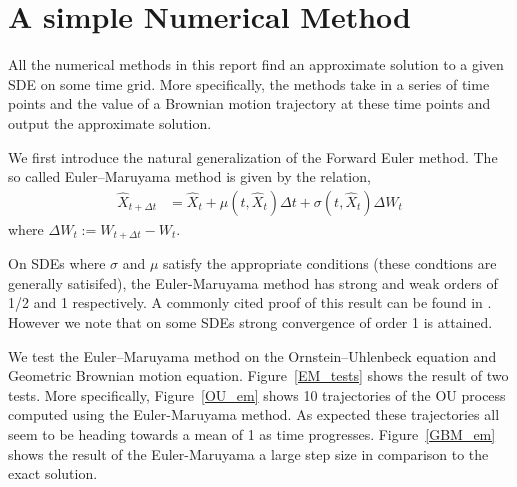 \documentclass[12pt]{article}
\begin{document}
\section{A simple Numerical Method}
All the numerical methods in this report find an approximate solution to a given SDE on some time grid. More specifically, the methods take in a series of time points and the value of a Brownian motion trajectory at these time points and output the approximate solution.

We first introduce the natural generalization of the Forward Euler method. The so called Euler--Maruyama method \cite{sdes} is given by the relation,
\begin{align*}
        \hat{X}_{t+\Delta t} &= \hat{X}_t + \mu(t,\hat{X}_{t}) \Delta t + \sigma(t,\hat{X}_{t}) \Delta W_{t}
\end{align*}
where \( \Delta W_t:=W_{t+\Delta t}-W_t \).


On SDEs where \( \sigma \) and \( \mu \) satisfy the appropriate conditions (these condtions are generally satisifed), the Euler-Maruyama method has strong and weak orders of 1/2 and 1 respectively. A commonly cited proof of this result can be found in \cite{kloeden}. However we note that on some SDEs strong convergence of order 1 is attained.

We test the Euler--Maruyama method on the Ornstein--Uhlenbeck equation and Geometric Brownian motion equation. Figure~\ref{EM_tests} shows the result of two tests. More specifically, Figure~\ref{OU_em} shows 10 trajectories of the OU process computed using the Euler-Maruyama method. As expected these trajectories all seem to be heading towards a mean of 1 as time progresses. Figure~\ref{GBM_em} shows the result of the Euler-Maruyama a large step size in comparison to the exact solution.
\end{document}
